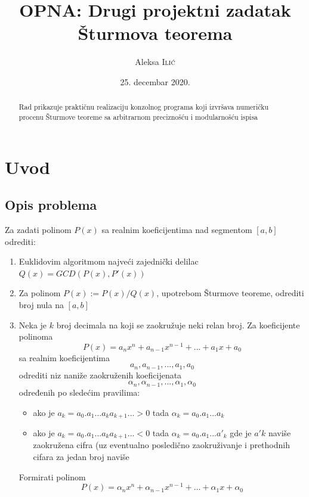 \documentclass[a4paper,10pt]{article}
\title{OPNA: Drugi projektni zadatak \\ Šturmova teorema} %
\author{Aleksa \textsc{Ilić}} %
\date{25. decembar 2020.} %
\begin{document}
\maketitle %

\begin{abstract}
    Rad prikazuje praktičnu realizaciju konzolnog programa koji izvršava numeričku procenu Šturmove teoreme sa arbitrarnom preciznošću i modularnošću ispisa
\end{abstract}


\section{Uvod}
\subsection{Opis problema}

Za zadati polinom $P(x)$ sa realnim koeficijentima nad segmentom $[a,b]$ odrediti:

\begin{enumerate}
    \item Euklidovim algoritmom najveći zajednički delilac $Q(x) = GCD(P(x), P'(x))$
    \item Za polinom $P(x) := P(x)/Q(x)$, upotrebom Šturmove teoreme, odrediti broj nula na $[a,b]$
    \item Neka je $k$ broj decimala na koji se zaokružuje neki relan broj. Za koeficijente polinoma
    \[P(x) = a_nx^n + a_{n-1}x^{n-1} + ... + a_1x + a_0\]
    sa realnim koeficijentima
    \[a_n,a_{n-1},...,a_1,a_0\]
    odrediti niz naniže zaokruženih koeficijenata
    \[\alpha_n,\alpha_{n-1},...,\alpha_1,\alpha_0\]
    određenih po sledećim pravilima:
    \begin{itemize}
        \item ako je $a_k = a_0.a_1 ... a_ka_{k+1} ... > 0$ tada $\alpha_k = a_0.a_1 ... a_k$
        \item ako je $a_k = a_0.a_1 ... a_ka_{k+1} ... < 0$ tada $\alpha_k = a_0.a_1 ... a'_k$
        \hfill \break
        gde je $a′k$ naviše zaokružena cifra (uz eventualno posledično zaokruživanje i prethodnih cifara za jedan broj naviše
    \end{itemize}
    Formirati polinom
    \[P(x) = \alpha_nx^n + \alpha_{n-1}x^{n-1} + ... + \alpha_1x + \alpha_0\]
\end{enumerate}
\end{document}
